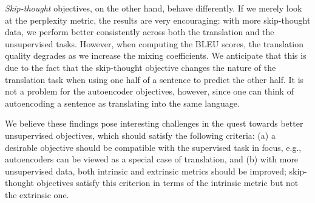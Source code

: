 {\it Skip-thought} objectives, on the other hand, behave differently. If we
merely look at the perplexity metric, the results are very encouraging: with
more skip-thought data, we perform better consistently across both the
translation and the unsupervised tasks. However, when computing the BLEU scores,
the translation quality degrades as we increase the mixing coefficients. We anticipate that
this is due to the fact that the skip-thought objective changes the nature of
the translation task when using one half of a sentence to predict the other
half. It is not a problem for the autoencoder objectives, however, since one can
think of autoencoding a sentence as translating into the same language.

We believe these findings pose interesting challenges in the quest towards  better
unsupervised objectives, which should satisfy the following criteria: (a)
a desirable objective should be compatible with the supervised task in focus, e.g.,
autoencoders can be viewed as a special case of translation,
and (b) with more unsupervised data, both intrinsic and extrinsic metrics
should be improved; skip-thought objectives satisfy this criterion in terms of
the intrinsic metric but not the extrinsic one.




